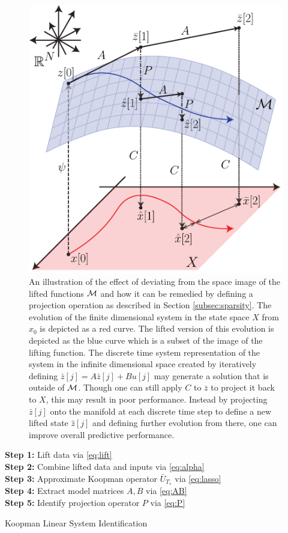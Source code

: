 \begin{figure}
    \centering
    \includegraphics[width=0.9\linewidth]{figures/liftingManifold_v17.pdf}
    \caption{An illustration of the effect of deviating from the space image of the lifted functions ${\cal M}$ and how it can be remedied by defining a projection operation as described in Section \ref{subsec:sparsity}. 
    The evolution of the finite dimensional system in the state space $X$ from $x_0$ is depicted as a red curve. 
    The lifted version of this evolution is depicted as the blue curve which is a subset of the image of the lifting function.
    The discrete time system representation of the system in the infinite dimensional space created by iteratively defining $\bar{z}[j]= A\bar{z}[j]+Bu[j]$ may generate a solution that is outside of ${\cal M}$.
    Though one can still apply $C$ to $\bar{z}$ to project it back to $X$, this may result in poor performance.
    Instead by projecting $\bar{z}[j]$ onto the manifold at each discrete time step to define a new lifted state $\hat{z}[j]$ and defining further evolution from there, one can improve overall predictive performance. }
    \label{fig:manifold}
\end{figure}


\begin{algorithm}[t]
\SetAlgoLined
{}
\textbf{Step 1:} Lift data via \eqref{eq:lift} \\
\textbf{Step 2:} Combine lifted data and inputs via \eqref{eq:alpha} \\
\textbf{Step 3:} Approximate Koopman operator $\bar{U}_{T_s}$ via \eqref{eq:lasso} \\
\textbf{Step 4:} Extract model matrices $A,B$ via \eqref{eq:AB} \\
\textbf{Step 5:} Identify projection operator $P$ via \eqref{eq:P} \\
 \caption{Koopman Linear System Identification}
 \label{alg:mpc}
\end{algorithm}